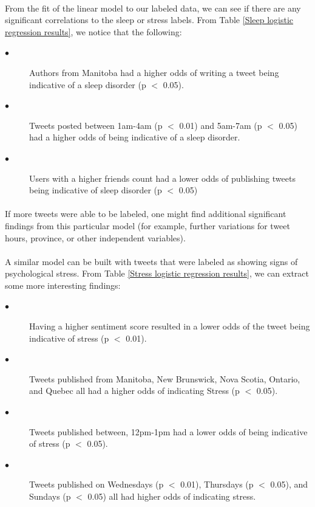 \documentclass{article}
\begin{document}
\paragraph{}
From the fit of the linear model to our labeled data, we can see if there are any significant correlations to the sleep or stress labels.  From Table \ref{Sleep logistic regression results}, we notice that the following:

\begin{description}
  \item[$\bullet$ ] Authors from Manitoba had a higher odds of writing a tweet being indicative of a sleep disorder (p $<$ 0.05).  
  \item[$\bullet$ ] Tweets posted between 1am-4am (p $<$ 0.01) and 5am-7am (p $<$ 0.05) had a higher odds of being indicative of a sleep disorder.
  \item[$\bullet$ ] Users with a higher friends count had a lower odds of publishing tweets being indicative of sleep disorder (p $<$ 0.05)
\end{description}

\paragraph{}
 If more tweets were able to be labeled, one might find additional significant findings from this particular model (for example, further variations for tweet hours, province, or other independent variables).  

\paragraph{}
A similar model can be built with tweets that were labeled as showing signs of psychological stress. From Table \ref{Stress logistic regression results}, we can extract some more interesting findings:

\begin{description}
   \item[$\bullet$ ] Having a higher sentiment score resulted in a lower odds of the tweet being indicative of stress (p $<$ 0.01). 
   \item[$\bullet$ ] Tweets published from Manitoba, New Brunswick, Nova Scotia, Ontario, and Quebec all had a higher odds of indicating Stress (p $<$ 0.05).  
   \item[$\bullet$ ] Tweets published between, 12pm-1pm had a lower odds of being indicative of stress (p $<$ 0.05).
   \item[$\bullet$ ] Tweets published on Wednesdays (p $<$ 0.01), Thursdays (p $<$ 0.05), and Sundays (p $<$ 0.05) all had higher odds of indicating stress.
   \end{description}
\end{document}
